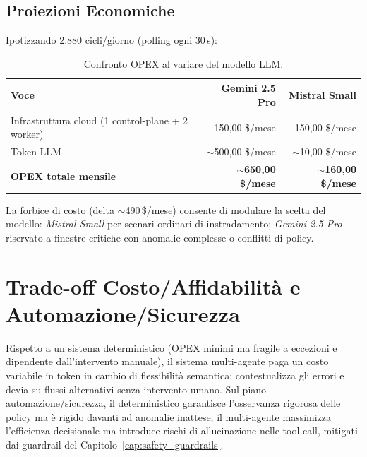 \subsection*{Proiezioni Economiche}
Ipotizzando 2.880 cicli/giorno (polling ogni 30\,s):

\begin{table}[ht]
\centering
\begin{tabular}{lrr}
\toprule
\textbf{Voce} & \textbf{Gemini 2.5 Pro} & \textbf{Mistral Small} \\
\midrule
Infrastruttura cloud (1 control-plane + 2 worker) & 150{,}00 \$/mese & 150{,}00 \$/mese \\
Token LLM & $\sim$500{,}00 \$/mese & $\sim$10{,}00 \$/mese \\
\midrule
\textbf{OPEX totale mensile} & \textbf{$\sim$650{,}00 \$/mese} & \textbf{$\sim$160{,}00 \$/mese} \\
\bottomrule
\end{tabular}
\caption{Confronto OPEX al variare del modello LLM.}
\label{tab:costi_opex}
\end{table}

La forbice di costo (delta $\sim$490\,\$/mese) consente di modulare la scelta del modello: \textit{Mistral Small} per scenari ordinari di instradamento; \textit{Gemini 2.5 Pro} riservato a finestre critiche con anomalie complesse o conflitti di policy.

\section{Trade-off Costo/Affidabilità e Automazione/Sicurezza}
\label{sec:analisi_tradeoff}

Rispetto a un sistema deterministico (OPEX minimi ma fragile a eccezioni e dipendente dall'intervento manuale), il sistema multi-agente paga un costo variabile in token in cambio di flessibilità semantica: contestualizza gli errori e devia su flussi alternativi senza intervento umano. Sul piano automazione/sicurezza, il deterministico garantisce l'osservanza rigorosa delle policy ma è rigido davanti ad anomalie inattese; il multi-agente massimizza l'efficienza decisionale ma introduce rischi di allucinazione nelle tool call, mitigati dai guardrail del Capitolo~\ref{cap:safety_guardrails}.
